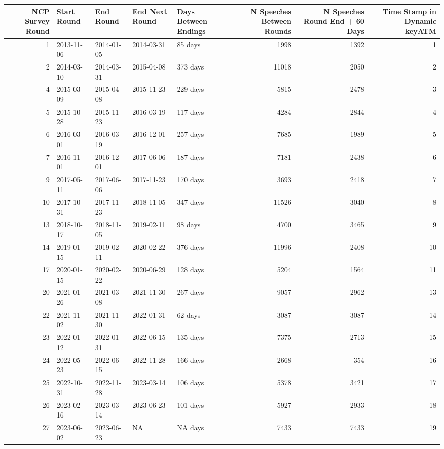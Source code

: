 
\begin{tabular}{rllllrrr}
\toprule
NCP Survey Round & Start  Round & End  Round & End Next  Round & Days Between  Endings & N Speeches Between  Rounds & N Speeches  Round End + 60 Days & Time Stamp in Dynamic keyATM\\
\midrule
1 & 2013-11-06 & 2014-01-05 & 2014-03-31 & 85 days & 1998 & 1392 & 1\\
2 & 2014-03-10 & 2014-03-31 & 2015-04-08 & 373 days & 11018 & 2050 & 2\\
4 & 2015-03-09 & 2015-04-08 & 2015-11-23 & 229 days & 5815 & 2478 & 3\\
5 & 2015-10-28 & 2015-11-23 & 2016-03-19 & 117 days & 4284 & 2844 & 4\\
6 & 2016-03-01 & 2016-03-19 & 2016-12-01 & 257 days & 7685 & 1989 & 5\\
7 & 2016-11-01 & 2016-12-01 & 2017-06-06 & 187 days & 7181 & 2438 & 6\\
9 & 2017-05-11 & 2017-06-06 & 2017-11-23 & 170 days & 3693 & 2418 & 7\\
10 & 2017-10-31 & 2017-11-23 & 2018-11-05 & 347 days & 11526 & 3040 & 8\\
13 & 2018-10-17 & 2018-11-05 & 2019-02-11 & 98 days & 4700 & 3465 & 9\\
14 & 2019-01-15 & 2019-02-11 & 2020-02-22 & 376 days & 11996 & 2408 & 10\\
17 & 2020-01-15 & 2020-02-22 & 2020-06-29 & 128 days & 5204 & 1564 & 11\\
20 & 2021-01-26 & 2021-03-08 & 2021-11-30 & 267 days & 9057 & 2962 & 13\\
22 & 2021-11-02 & 2021-11-30 & 2022-01-31 & 62 days & 3087 & 3087 & 14\\
23 & 2022-01-12 & 2022-01-31 & 2022-06-15 & 135 days & 7375 & 2713 & 15\\
24 & 2022-05-23 & 2022-06-15 & 2022-11-28 & 166 days & 2668 & 354 & 16\\
25 & 2022-10-31 & 2022-11-28 & 2023-03-14 & 106 days & 5378 & 3421 & 17\\
26 & 2023-02-16 & 2023-03-14 & 2023-06-23 & 101 days & 5927 & 2933 & 18\\
27 & 2023-06-02 & 2023-06-23 & NA & NA days & 7433 & 7433 & 19\\
\bottomrule
\end{tabular}
